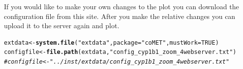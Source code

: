 \documentclass[11pt]{article}\usepackage[]{graphicx}\usepackage[usenames,dvipsnames]{color}
\makeatletter
\newcommand{\hlnum}[1]{\textcolor[rgb]{0.686,0.059,0.569}{#1}}%
\newcommand{\hlstr}[1]{\textcolor[rgb]{0.192,0.494,0.8}{#1}}%
\newcommand{\hlcom}[1]{\textcolor[rgb]{0.678,0.584,0.686}{\textit{#1}}}%
\newcommand{\hlstd}[1]{\textcolor[rgb]{0.345,0.345,0.345}{#1}}%
\newcommand{\hlkwb}[1]{\textcolor[rgb]{0.69,0.353,0.396}{#1}}%
\newcommand{\hlkwc}[1]{\textcolor[rgb]{0.333,0.667,0.333}{#1}}%
\newcommand{\hlkwd}[1]{\textcolor[rgb]{0.737,0.353,0.396}{\textbf{#1}}}%
\newenvironment{kframe}{%
 \def\at@end@of@kframe{}%
 \ifinner\ifhmode%
  \def\at@end@of@kframe{\end{minipage}}%
  \begin{minipage}{\columnwidth}%
 \fi\fi%
 \def\FrameCommand##1{\hskip\@totalleftmargin \hskip-\fboxsep
 \colorbox{shadecolor}{##1}\hskip-\fboxsep
     \hskip-\linewidth \hskip-\@totalleftmargin \hskip\columnwidth}%
 \MakeFramed {\advance\hsize-\width
   \@totalleftmargin\z@ \linewidth\hsize
   \@setminipage}}%
 {\par\unskip\endMakeFramed%
 \at@end@of@kframe}
\newenvironment{knitrout}{}{} %
\makeatother
\begin{document}
If you would like to make your own changes to the plot you can download the configuration file from this site. After you make the relative changes you can upload it to the server again and plot.

\begin{knitrout}
\color{fgcolor}\begin{kframe}
\begin{alltt}
\hlstd{extdata} \hlkwb{<-} \hlkwd{system.file}\hlstd{(}\hlstr{"extdata"}\hlstd{,} \hlkwc{package}\hlstd{=}\hlstr{"coMET"}\hlstd{,}\hlkwc{mustWork}\hlstd{=}\hlnum{TRUE}\hlstd{)}
\hlstd{configfile} \hlkwb{<-} \hlkwd{file.path}\hlstd{(extdata,} \hlstr{"config_cyp1b1_zoom_4webserver.txt"}\hlstd{)}
\hlcom{#configfile <- "../inst/extdata/config_cyp1b1_zoom_4webserver.txt" }


\end{alltt}
\end{kframe}
\end{knitrout}
\end{document}
